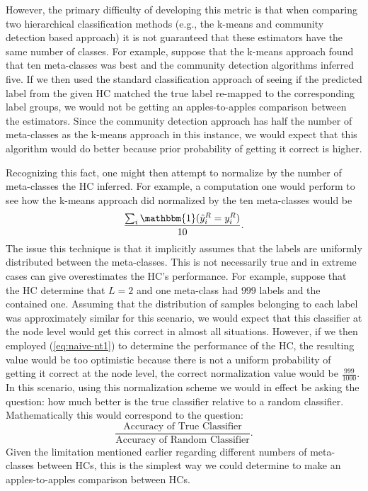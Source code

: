 \documentclass[../thesis.tex]{subfiles}
\begin{document}
However, the primary difficulty of developing this metric is that when comparing two hierarchical classification methods (e.g., the k-means and community detection based approach) it is not guaranteed that these estimators have the same number of classes. For example, suppose that the k-means approach found that ten meta-classes was best and the community detection algorithms inferred five. If we then used the standard classification approach of seeing if the predicted label from the given HC matched the true label re-mapped to the corresponding label groups, we would not be getting an apples-to-apples comparison between the estimators. Since the community detection approach has half the number of meta-classes as the k-means approach in this instance, we would expect that this algorithm would do better because prior probability of getting it correct is higher. 

Recognizing this fact, one might then attempt to normalize by the number of meta-classes the HC inferred. For example, a computation one would perform to see how the k-means approach did normalized by the ten meta-classes would be
\begin{equation}
    \label{eq:naive-nt1}
    \frac{\sum_i \mathbbm{1}(\hat{y}_i^R = y_i^R)}{10}.
\end{equation}
The issue this technique is that it implicitly assumes that the labels are uniformly distributed between the meta-classes. This is not necessarily true and in extreme cases can give overestimates the HC's performance. For example, suppose that the HC determine that $L=2$ and one meta-class had $999$ labels and the contained one. Assuming that the distribution of samples belonging to each label was approximately similar for this scenario, we would expect that this classifier at the node level would get this correct in almost all situations. However, if we then employed (\ref{eq:naive-nt1}) to determine the performance of the HC, the resulting value would be too optimistic because there is not a uniform probability of getting it correct at the node level, the correct normalization value would be $\frac{999}{1000}$. In this scenario, using this normalization scheme we would in effect be asking the question: how much better is the true classifier relative to a random classifier. Mathematically this would correspond to the question:
\begin{equation*}
    \frac{\text{Accuracy of True Classifier}}{\text{Accuracy of Random Classifier}}.
\end{equation*}
Given the limitation mentioned earlier regarding different numbers of meta-classes between HCs, this is the simplest way we could determine to make an apples-to-apples comparison between HCs.
\end{document}
